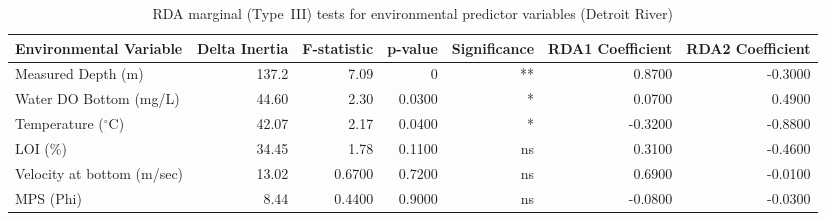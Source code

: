 \begin{table}[htbp]
  \centering
  \caption{RDA marginal (Type~III) tests for environmental predictor variables (Detroit River)}
  \label{tab:dr_RDA_analysis_rda_terms_summary}
  \small
  \begin{tabular}{lrrrrrr}
    \toprule
    Environmental Variable & Delta Inertia & F-statistic & p-value & Significance & RDA1 Coefficient & RDA2 Coefficient \\
    \midrule
    Measured Depth (m) & 137.2 & 7.09 & 0 & ** & 0.8700 & -0.3000 \\
    Water DO Bottom (mg/L) & 44.60 & 2.30 & 0.0300 & * & 0.0700 & 0.4900 \\
    Temperature ($^{\circ}$C) & 42.07 & 2.17 & 0.0400 & * & -0.3200 & -0.8800 \\
    LOI (\%) & 34.45 & 1.78 & 0.1100 & ns & 0.3100 & -0.4600 \\
    Velocity  at bottom (m/sec) & 13.02 & 0.6700 & 0.7200 & ns & 0.6900 & -0.0100 \\
    MPS (Phi) & 8.44 & 0.4400 & 0.9000 & ns & -0.0800 & -0.0300 \\
    \bottomrule
  \end{tabular}
\end{table}
